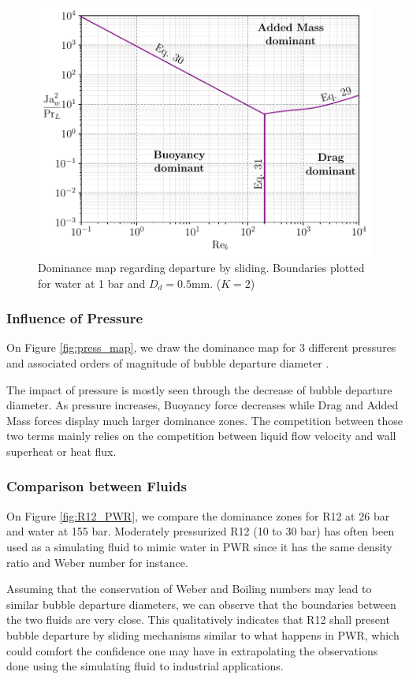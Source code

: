 \begin{figure}[h!]
\centering
\includegraphics[width=0.7\linewidth]{img/forces/ND_map1.pdf}
\caption{Dominance map regarding departure by sliding. Boundaries plotted for water at 1 bar and $D_{d}=0.5$mm. ($K=2$)}
\label{fig:ND_map1}
\end{figure}



\subsubsection{Influence of Pressure}

On Figure \ref{fig:press_map}, we draw the dominance map for 3 different pressures and associated orders of magnitude of bubble departure diameter \cite{kocamustafaogullari_pressure_1983}.

The impact of pressure is mostly seen through the decrease of bubble departure diameter. As pressure increases, Buoyancy force decreases while Drag and Added Mass forces display much larger dominance zones. The competition between those two terms mainly relies on the competition between liquid flow velocity and wall superheat or heat flux.

 
\subsubsection{Comparison between Fluids}

 
On Figure \ref{fig:R12_PWR}, we compare the dominance zones for R12 at 26 bar and water at 155 bar. Moderately pressurized R12 (10 to 30 bar) has often been used as a simulating fluid to mimic water in PWR since it has the same density ratio and Weber number for instance.

Assuming that the conservation of Weber and Boiling numbers may lead to similar bubble departure diameters, we can observe that the boundaries between the two fluids are very close. This qualitatively indicates that R12 shall present bubble departure by sliding mechanisms similar to what happens in PWR, which could comfort the confidence one may have in extrapolating the observations done using the simulating fluid to industrial applications.






